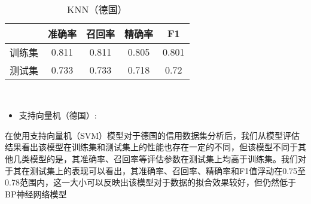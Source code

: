\documentclass[12pt,a4paper]{nmmcm}
\begin{document}
\\\begin{table}[H]
\centering
 \caption{KNN（德国）}
\begin{tabular}{ccccc}
\hline
 & 准确率   & 召回率   & 精确率   & F1    \\
\hline
训练集   & 0.811 &0.811& 0.805& 0.801\\
测试集   & 0.733& 0.733 & 0.718 & 0.72  \\
\hline
\end{tabular}
\end{table}


\\
\begin{itemize}
   \item
支持向量机（德国）:
\end{itemize}
在使用支持向量机（SVM）模型对于德国的信用数据集分析后，我们从模型评估结果看出该模型在训练集和测试集上的性能也存在一定的不同，但该模型不同于其他几类模型的是，其准确率、召回率等评估参数在测试集上均高于训练集。我们对于其在测试集上的表现可以看出，其准确率、召回率、精确率和F1值浮动在0.75至0.78范围内，这一大小可以反映出该模型对于数据的拟合效果较好，但仍然低于BP神经网络模型
\\
\end{document}
